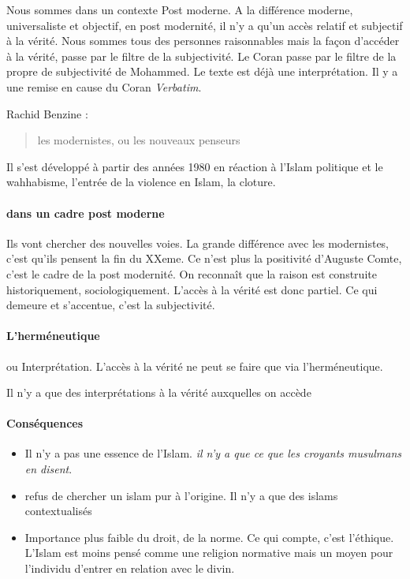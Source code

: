   \begin{Synthesis}
  Nous sommes dans un contexte Post moderne. A la différence moderne, universaliste et objectif, en post modernité, il n'y a qu'un accès relatif et subjectif à la vérité.
  Nous sommes tous des personnes raisonnables mais la façon d'accéder à la vérité, passe par le filtre de la subjectivité. 
  Le Coran passe par le filtre de la propre de subjectivité de Mohammed. Le texte est déjà une interprétation. Il y a une remise en cause du Coran \textit{Verbatim}.  
  \end{Synthesis}
  
Rachid Benzine : 
\begin{quote}
    les modernistes, ou les nouveaux penseurs
\end{quote}  

Il s'est développé à partir des années 1980 en réaction à l'Islam politique et le wahhabisme, l'entrée de la violence en Islam, la cloture.

\paragraph{dans un cadre post moderne}
Ils vont chercher des nouvelles voies. La grande différence avec les modernistes, c'est qu'ils pensent la fin du XXeme. Ce n'est plus la positivité d'Auguste Comte, c'est le cadre de la post modernité. On reconnaît que la raison est construite historiquement, sociologiquement. L'accès à la vérité est donc partiel. Ce qui demeure et s'accentue, c'est la subjectivité.

\paragraph{L'herméneutique} ou Interprétation. L'accès à la vérité ne peut se faire que via l'herméneutique.

\begin{Def}[herméneutique]
Il n'y a que des interprétations à la vérité auxquelles on accède
\end{Def}

\paragraph{Conséquences} 
\begin{itemize}
    \item Il n'y a pas une essence de l'Islam. \textit{il n'y a que ce que les croyants musulmans en disent}.
    \item refus de chercher un islam pur à l'origine. Il n'y a que des islams contextualisés
    \item Importance plus faible du droit, de la norme. Ce qui compte, c'est l'éthique. L'Islam est moins pensé comme une religion normative mais un moyen pour l'individu d'entrer en relation avec le divin.
\end{itemize}

